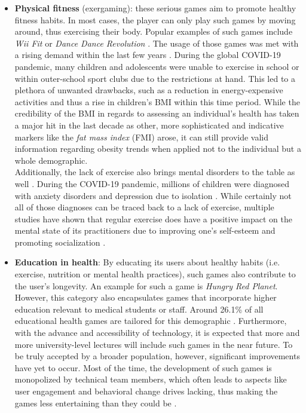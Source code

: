 \documentclass[draft,final]{vutinfth} %
\begin{document}
\begin{itemize}
\item \textbf{Physical fitness} (exergaming): these serious games aim to promote healthy fitness habits. In most cases, the player can only play such games by moving around, thus exercising their body.%
Popular examples of such games include \emph{Wii Fit} \cite{nitz2010wii} or \emph{Dance Dance Revolution} \cite{trout2005using}. The usage of those games was met with a rising demand within the last few years \cite{santos2021active}. During the global COVID-19 pandemic, many children and adolescents were unable to exercise in school or within outer-school sport clubs due to the restrictions at hand. This led to a plethora of unwanted drawbacks, such as a reduction in energy-expensive activities and thus a rise in children's BMI within this time period. While the credibility of the BMI in regards to assessing an individual's health has taken a major hit in the last decade \cite{alpizar2020fat} as other, more sophisticated and indicative markers like the \emph{fat mass index} (FMI) arose, it can still provide valid information regarding obesity trends when applied not to the individual but a whole demographic. \\
Additionally, the lack of exercise also brings mental disorders to the table as well \cite{santos2021active}. During the COVID-19 pandemic, millions of children were diagnosed with anxiety disorders and depression due to isolation \cite{santos2021active}. While certainly not all of those diagnoses can be traced back to a lack of exercise, multiple studies have shown that regular exercise does have a positive impact on the mental state of its practitioners due to improving one's self-esteem and promoting socialization \cite{santos2021active,comeras2021effects}. 

\item \textbf{Education in health}: By educating its users about healthy habits (i.e. exercise, nutrition or mental health practices), such games also contribute to the user's longevity. An example for such a game is \emph{Hungry Red Planet}\cite{anderson2002hungry}. However, this category also encapsulates games that incorporate higher education relevant to medical students or staff. Around 26.1\% of all educational health games are tailored for this demographic \cite{sharifzadeh2020health}. Furthermore, with the advance and accessibility of technology, it is expected that more and more university-level lectures will include such games in the near future. To be truly accepted by a broader population, however, significant improvements have yet to occur. Most of the time, the development of such games is monopolized by technical team members, which often leads to aspects like user engagement and behavioral change drives lacking, thus making the games less entertaining than they could be \cite{sharifzadeh2020health}.


\end{itemize}
\end{document}
